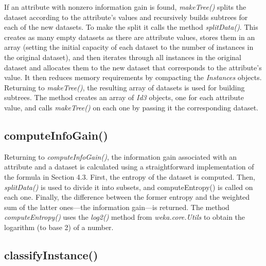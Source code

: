 If an attribute with nonzero information gain is found, \textit{makeTree()}
splits the dataset according to the attribute's values and recursively
builds subtrees for each of the new datasets. To make the split it
calls the method \textit{splitData()}. This creates as many empty datasets as
there are attribute values, stores them in an array (setting the
initial capacity of each dataset to the number of instances in the
original dataset), and then iterates through all instances in the
original dataset and allocates them to the new dataset that
corresponds to the attribute’s value. It then reduces memory
requirements by compacting the \textit{Instances} objects. Returning to
\textit{makeTree()}, the resulting array of datasets is used for building
subtrees. The method creates an array of \textit{Id3} objects, one for
each attribute value, and calls \textit{makeTree()} on each one by
passing it the corresponding dataset.

\subsection{computeInfoGain()}

Returning to \textit{computeInfoGain()}, the information gain
associated with an attribute and a dataset is calculated using a
straightforward implementation of the formula in Section 4.3. First,
the entropy of the dataset is computed. Then, \textit{splitData()} is
used to divide it into subsets, and computeEntropy() is called on each
one. Finally, the difference between the former entropy and the
weighted sum of the latter ones---the information gain---is
returned. The method \textit{computeEntropy()} uses
the \textit{log2()} method from \textit{weka.core.Utils} to obtain the
logarithm (to base 2) of a number.

\subsection{classifyInstance()}

